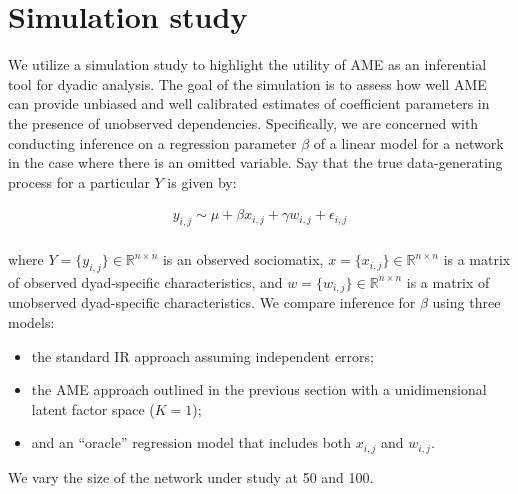 \section{Simulation study}

We utilize a simulation study to highlight the utility of AME as an inferential tool for dyadic analysis. The goal of the simulation is to assess how well AME can provide unbiased and well calibrated estimates of coefficient parameters in the presence of unobserved dependencies. Specifically, we are concerned with conducting inference on a regression parameter $\beta$ of a linear model for a network in the case where there is an omitted variable. Say that the true data-generating process for a particular $Y$ is given by:

\begin{align*}
	y_{i,j} \sim  \mu + \beta x_{i,j} + \gamma w_{i,j} + \epsilon_{i,j} \\
	\label{eqn:sim}
\end{align*}

where $Y= \{y_{i,j}\}\in \mathbb R^{n\times n}$ is an observed sociomatix, $x = \{x_{i,j} \} \in \mathbb R^{n \times n}$ is a matrix of observed dyad-specific characteristics, and $w = \{ w_{i,j}\} \in \mathbb R^{n \times n}$ is a matrix of unobserved dyad-specific characteristics. We compare inference for $\beta$ using three models:

\begin{itemize}
	\item the standard IR approach assuming independent errors; 
	\item the AME approach outlined in the previous section with a unidimensional latent factor space ($K=1$);
	\item and an ``oracle'' regression model that includes both $x_{i,j}$ and $w_{i,j}$. 
\end{itemize}

We vary the size of the network under study at 50 and 100.

